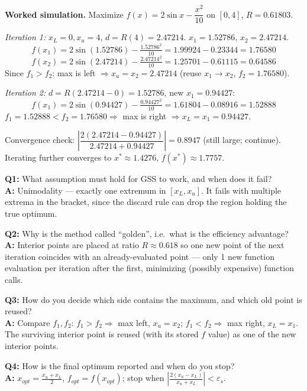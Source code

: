 \begin{examplebox}
\textbf{Worked simulation.} Maximize $f(x) = 2\sin x - \dfrac{x^2}{10}$ on $[0,4]$, $R=0.61803$.

\emph{Iteration 1:} $x_L=0,x_u=4$, $d=R(4)=2.47214$. $x_1=1.52786$, $x_2=2.47214$.
\[
f(x_1)=2\sin(1.52786)-\tfrac{1.52786^2}{10}=1.99924-0.23344=1.76580
\]
\[
f(x_2)=2\sin(2.47214)-\tfrac{2.47214^2}{10}=1.25701-0.61115=0.64586
\]
Since $f_1>f_2$: max is left $\Rightarrow x_u=x_2=2.47214$ (reuse $x_1\to x_2$, $f_2=1.76580$).

\emph{Iteration 2:} $d=R(2.47214-0)=1.52786$, new $x_1=0.94427$:
\[
f(x_1)=2\sin(0.94427)-\tfrac{0.94427^2}{10}=1.61804-0.08916=1.52888
\]
$f_1=1.52888 < f_2=1.76580 \Rightarrow$ max is right $\Rightarrow x_L=x_1=0.94427$.

Convergence check: $\left|\dfrac{2(2.47214-0.94427)}{2.47214+0.94427}\right| = 0.8947$ (still large; continue). Iterating further converges to $x^\ast\approx1.4276$, $f(x^\ast)\approx1.7757$.
\end{examplebox}

\begin{qabox}
\textbf{Q1:} What assumption must hold for GSS to work, and when does it fail? \\
\textbf{A:} Unimodality — exactly one extremum in $[x_L,x_u]$. It fails with multiple extrema in the bracket, since the discard rule can drop the region holding the true optimum.

\textbf{Q2:} Why is the method called ``golden'', i.e.\ what is the efficiency advantage? \\
\textbf{A:} Interior points are placed at ratio $R\approx0.618$ so one new point of the next iteration coincides with an already-evaluated point — only 1 new function evaluation per iteration after the first, minimizing (possibly expensive) function calls.

\textbf{Q3:} How do you decide which side contains the maximum, and which old point is reused? \\
\textbf{A:} Compare $f_1,f_2$: $f_1>f_2\Rightarrow$ max left, $x_u=x_2$; $f_1<f_2\Rightarrow$ max right, $x_L=x_1$. The surviving interior point is reused (with its stored $f$ value) as one of the new interior points.

\textbf{Q4:} How is the final optimum reported and when do you stop? \\
\textbf{A:} $x_{opt}=\frac{x_u+x_L}{2}$, $f_{opt}=f(x_{opt})$; stop when $\left|\frac{2(x_u-x_L)}{x_u+x_L}\right|<\varepsilon_s$.
\end{qabox}

